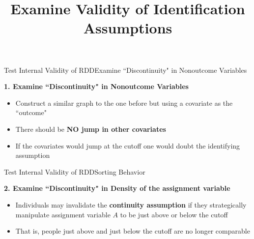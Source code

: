 \documentclass[hyperref={pdfpagelabels=false}]{beamer}
\begin{document}
\title[]  
{Examine Validity of Identification Assumptions}


\author 
{}

\institute{}






\date
{}


\begin{frame}{}
	\titlepage
\end{frame}




\begin{frame}{Test Internal Validity of RDD}{Examine ``Discontinuity" in Nonoutcome Variables}
	
	\textbf{1. Examine ``Discontinuity" in Nonoutcome Variables}
	
	\begin{itemize}
		\vspace{0.2cm}	
		\item Construct a similar graph to the one before but using a covariate as the ``outcome"
		\vspace{0.2cm}	
		\item There should be \textbf{NO jump in other covariates}
		\vspace{0.2cm}	
		\item If the covariates would jump at the cutoff one would doubt the identifying assumption
		
	\end{itemize}
\end{frame}




\begin{frame}{Test Internal Validity of RDD}{Sorting Behavior}
	
	\textbf{2. Examine ``Discontinuity" in Density of the assignment variable}
	
	\begin{itemize}
		\vspace{0.2cm}	
		\item Individuals may invalidate the \textbf{continuity assumption} if they strategically manipulate assignment variable $A$ to be just above or below the cutoff
		\vspace{0.2cm}
		\item That is, people just above and just below the cutoff are no longer comparable
		\vspace{0.2cm}
		
		
	\end{itemize}
\end{frame}
\end{document}
